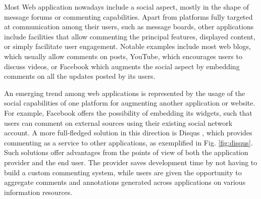 
Most Web application nowadays include a social aspect, mostly in the shape of
message forums or commenting capabilities. Apart from platforms fully targeted
at communication among their users, such as message boards, other applications
include facilities that allow commenting the principal features, displayed
content, or simply facilitate user engagement.  Notable examples include most
web blogs, which usually allow comments on posts, YouTube, which encourages
users to discuss videos, or Facebook which augments the social aspect by
embedding comments on all the updates posted by its users.

An emerging trend among web applications is represented by the usage of the
social capabilities of one platform for augmenting another application or
website. For example, Facebook offers the possibility of embedding its widgets,
such that users can comment on external sources using their existing social
network account. A more full-fledged solution in this direction is Disqus
\cite{ref:disqus}, which provides commenting as a service to other
applications, as exemplified in Fig. \ref{fig:disqus}. Such solutions offer
advantages from the points of view of both the application provider and the end
user. The provider saves development time by not having to build a custom
commenting system, while users are given the opportunity to aggregate comments
and annotations generated across applications on various information resources.

